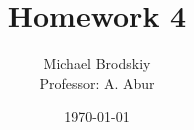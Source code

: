 


\title{Homework 4}
\date{\today}
\author{Michael Brodskiy\\ \small Professor: A. Abur}



\maketitle

